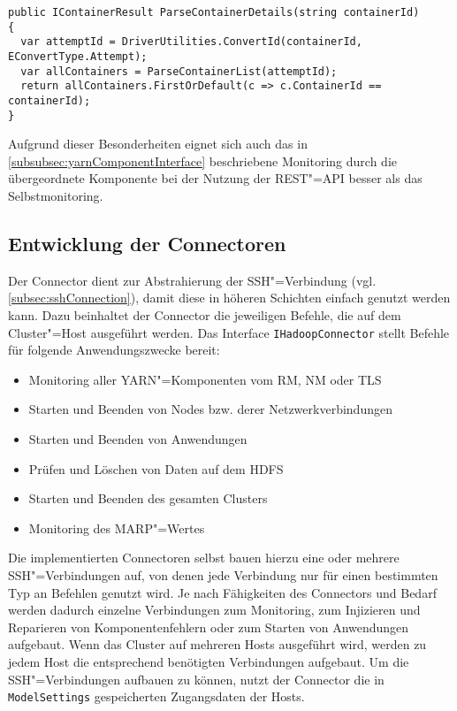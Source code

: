 \begin{lstlisting}[label=lst:restParseDetails,style=cs,
caption={[Konvertierung und Rückgabe der Daten eines einzelnen Containers durch den RestParser]
    Konvertierung und Rückgabe der Daten eines einzelnen Containers durch den \texttt{RestParser}.
    Hierbei muss zunächst die ID des übergeordneten Attempts ermittelt werden, bevor aus der Liste aller Container die Daten des gesuchten Containers zurückgegeben werden können.
    Bei Attempts ist dieses Vorgehen analog.}]
public IContainerResult ParseContainerDetails(string containerId)
{
  var attemptId = DriverUtilities.ConvertId(containerId, EConvertType.Attempt);
  var allContainers = ParseContainerList(attemptId);
  return allContainers.FirstOrDefault(c => c.ContainerId == containerId);
}
\end{lstlisting}

Aufgrund dieser Besonderheiten eignet sich auch das in \cref{subsubsec:yarnComponentInterface} beschriebene Monitoring durch die übergeordnete Komponente bei der Nutzung der REST"=API besser als das Selbstmonitoring.

\subsection{Entwicklung der Connectoren}
\label{subsec:implementedConnectors}

Der Connector dient zur Abstrahierung der SSH"=Verbindung (vgl. \cref{subsec:sshConnection}), damit diese in höheren Schichten einfach genutzt werden kann.
Dazu beinhaltet der Connector die jeweiligen Befehle, die auf dem Cluster"=Host ausgeführt werden.
Das Interface \texttt{IHadoopConnector} stellt Befehle für folgende Anwendungszwecke bereit:

\begin{itemize}
    \item Monitoring aller YARN"=Komponenten vom \ac{RM}, \ac{NM} oder \ac{TLS}
    \item Starten und Beenden von Nodes bzw. derer Netzwerkverbindungen
    \item Starten und Beenden von Anwendungen
    \item Prüfen und Löschen von Daten auf dem \ac{HDFS}
    \item Starten und Beenden des gesamten Clusters
    \item Monitoring des \ac{MARP}"=Wertes
\end{itemize}

Die implementierten Connectoren selbst bauen hierzu eine oder mehrere SSH"=Verbindungen auf, von denen jede Verbindung nur für einen bestimmten Typ an Befehlen genutzt wird.
Je nach Fähigkeiten des Connectors und Bedarf werden dadurch einzelne Verbindungen zum Monitoring, zum Injizieren und Reparieren von Komponentenfehlern oder zum Starten von Anwendungen aufgebaut.
Wenn das Cluster auf mehreren Hosts ausgeführt wird, werden zu jedem Host die entsprechend benötigten Verbindungen aufgebaut.
Um die SSH"=Verbindungen aufbauen zu können, nutzt der Connector die in \texttt{ModelSettings} gespeicherten Zugangsdaten der Hosts.

